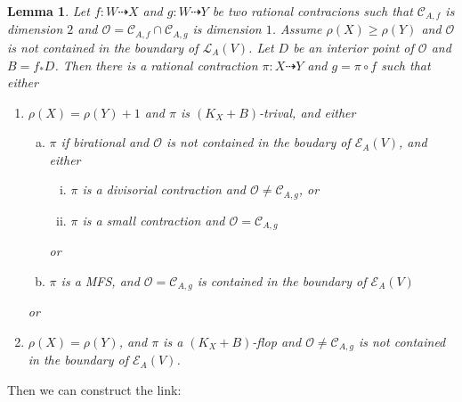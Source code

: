 \documentclass{article}
\newtheorem{lem}[defn]{Lemma}
\begin{document}
\begin{lem}
	Let $ f:W\dashrightarrow X $ and $ g:W\dashrightarrow  Y $ be two rational contracions such that $ \mathcal{C}_{A,f} $ is dimension $ 2 $ and $ \mathcal{O}=\mathcal{C}_{A,f}\cap \mathcal{C}_{A,g} $ is dimension $ 1 $. Assume $ \rho(X)\geqslant \rho(Y) $ and $ \mathcal{O} $ is not contained in the boundary of $ \mathcal{L}_{A}(V) $. Let $ D $ be an interior point of $ \mathcal{O} $ and $ B=f_*D $. Then there is a rational contraction $ \pi:X\dashrightarrow Y $ and $ g=\pi\circ f $ such that either
	\begin{enumerate}[1)]
		\item $ \rho(X)=\rho(Y)+1 $ and $ \pi  $ is $ (K_X+B) $-trival, and either
		\begin{enumerate}[a)]
			\item $ \pi $ if birational and $ \mathcal{O} $ is not contained in the boudary of $ \mathcal{E}_A(V) $, and either
			\begin{enumerate}[i)]
				\item $ \pi $ is a divisorial contraction and $ \mathcal{O}\neq \mathcal{C}_{A,g} $, or
				\item $ \pi $ is a small contraction and $ \mathcal{O}= \mathcal{C}_{A,g} $
			\end{enumerate}
			or
			\item $ \pi $ is a MFS, and $ \mathcal{O}=\mathcal{C}_{A,g} $ is contained in the boundary of $ \mathcal{E}_{A}(V) $
		\end{enumerate}
		or
		\item $ \rho(X)=\rho(Y) $, and $ \pi $ is  a $ (K_X+B) $-flop and $ \mathcal{O}\neq\mathcal{C}_{A,g} $ is not contained in the boundary of $ \mathcal{E}_A(V) $.
	\end{enumerate}
\end{lem}

Then we can construct the link:
\end{document}

